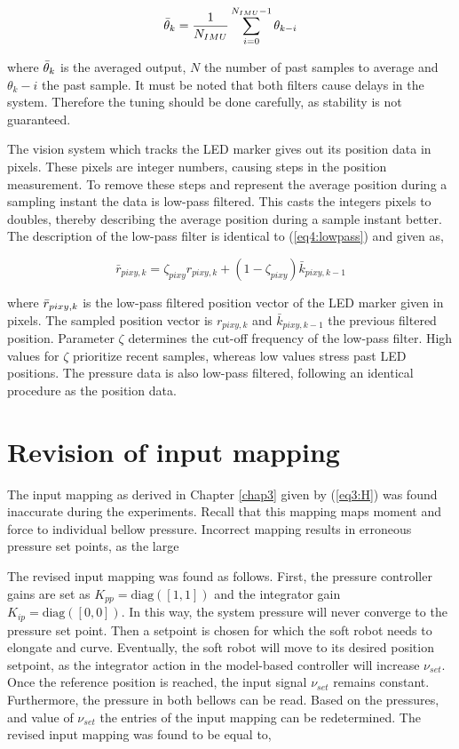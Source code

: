\begin{equation}
    \Bar{\theta}_k = \frac{1}{N_{IMU}}\sum_{i = 0} ^ {N_{IMU}-1} \theta_{k-i}
\end{equation}

where $\Bar{\theta}_k$ is the averaged output, $N$ the number of past samples to average and $\theta_k-i$ the past sample. It must be noted that both filters cause delays in the system. Therefore the tuning should be done carefully, as stability is not guaranteed.

The vision system which tracks the LED marker gives out its position data in pixels. These pixels are integer numbers, causing steps in the position measurement. To remove these steps and represent the average position during a sampling instant the data is low-pass filtered. This casts the integers pixels to doubles, thereby describing the average position during a sample instant better. The description of the low-pass filter is identical to (\ref{eq4:lowpass}) and given as,

\begin{equation}
\bar{r}_{pixy,k} = \zeta_{pixy} r_{pixy,k} + (1-\zeta_{pixy})\bar{k}_{pixy,k-1}
\label{eq5:lowpass}
\end{equation}

where $\Bar{r}_{pixy,k}$ is the low-pass filtered position vector of the LED marker given in pixels. The sampled position vector is $r_{pixy,k}$ and $\bar{k}_{pixy,k-1}$ the previous filtered position. Parameter $\zeta$ determines the cut-off frequency of the low-pass filter. High values for $\zeta$ prioritize recent samples, whereas low values stress past LED positions. The pressure data is also low-pass filtered, following an identical procedure as the position data. 


\section{Revision of input mapping}

The input mapping as derived in Chapter \ref{chap3} given by (\ref{eq3:H}) was found inaccurate during the experiments. Recall that this mapping maps moment and force to individual bellow pressure. Incorrect mapping results in erroneous pressure set points, as the large


The revised input mapping was found as follows. First, the pressure controller gains are set as $K_{pp} =\text{diag}([1,1])$ and the integrator gain $K_{ip} = \text{diag}([0,0])$. In this way, the system pressure will never converge to the pressure set point. Then a setpoint is chosen for which the soft robot needs to elongate and curve. Eventually, the soft robot will move to its desired position setpoint, as the integrator action in the model-based controller will increase $\nu_{set}$. Once the reference position is reached, the input signal $\nu_{set}$ remains constant. Furthermore, the pressure in both bellows can be read. Based on the pressures, and value of $\nu_{set}$ the entries of the input mapping can be redetermined. The revised input mapping was found to be equal to,


